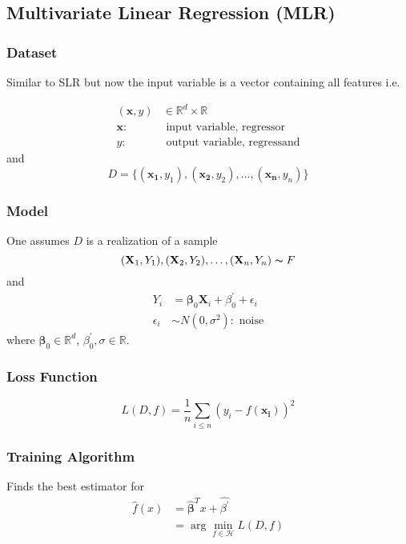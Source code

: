 \subsection{Multivariate Linear Regression (MLR)}
\subsubsection{Dataset}
Similar to SLR but now the input variable is a vector containing all features i.e.

\begin{align*}
    (\mathbf{x},y) & \in\mathbb{R}^d\times\mathbb{R}     \\
    \mathbf{x}:    & \text{ input variable, regressor}   \\
    y:             & \text{ output variable, regressand}
\end{align*}
and
\begin{equation*}
    D=\{(\mathbf{x_1},y_1),(\mathbf{x_2},y_2),\dots,(\mathbf{x_n},y_n)\}
\end{equation*}

\subsubsection{Model}
One assumes $D$ is a realization of a sample
\begin{equation*}
    (\mathbf{X}_1,Y_1),(\mathbf{X}_2,Y_2),\dots,(\mathbf{X}_n,Y_n)\thicksim F
\end{equation*}
and
\begin{align*}
    Y_i        & =\boldsymbol{\beta}_0\mathbf{X}_i+\beta^{\prime}_0+\epsilon_i \\
    \epsilon_i & \sim N(0,\sigma^2): \text{ noise}
\end{align*}
where $\boldsymbol{\beta}_0\in \mathbb{R}^d$, $\beta^{\prime}_0,\sigma \in \mathbb{R}$.

\subsubsection{Loss Function}
\begin{equation*}
    L(D,f)=\frac{1}{n}\sum_{i\leq n}{\left(y_i-f(\mathbf{x_i})\right)}^2
\end{equation*}


\subsubsection{Training Algorithm}
Finds the best estimator for
\begin{align*}
    \hat{f}(x) & =\hat{\boldsymbol{\beta}}^T x+\widehat{\beta^{\prime}} \\
               & =\arg\min_{f\in\mathcal{H}}L(D,f)
\end{align*}

